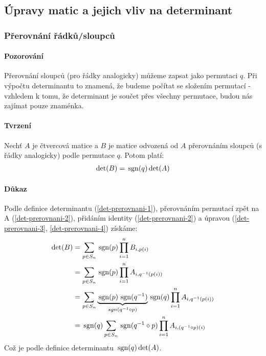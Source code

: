 \documentclass[a4paper,10pt]{article}
\begin{document}
\subsection{Úpravy matic a jejich vliv na determinant}
\setcounter{equation}{0}

\subsubsection{Přerovnání řádků/sloupců}
\setcounter{equation}{0}
\paragraph{Pozorování}
Přerovnání sloupců (pro řádky analogicky) můžeme zapsat jako permutaci $q$. Při
výpočtu determinantu to znamená, že budeme počítat se složením permutací -
vzhledem k tomu, že determinant je součet přes všechny permutace, budou nás
zajímat pouze znaménka.

\paragraph{Tvrzení}
Nechť $A$ je čtvercová matice a $B$ je matice odvozená od $A$ přerovnáním sloupců (s
řádky analogicky) podle permutace $q$. Potom platí:
\begin{align*} 
	\det(B) = \operatorname*{\,sgn} (q) \det (A)
\end{align*}

\paragraph{Důkaz}
Podle definice determinantu (\ref{det-prerovnani-1}), přerovnáním permutací zpět
na A (\ref{det-prerovnani-2}), přidáním identity (\ref{det-prerovnani-2}) a
úpravou (\ref{det-prerovnani-3}, \ref{det-prerovnani-4}) získáme:
\begin{align} 
	\det(B) &= \sum_{p \in S_n} \operatorname*{\,sgn} (p) \prod_{i=1}^n B_{i,p(i)}
							\label{det-prerovnani-1}\\
	&= \sum_{p \in S_n} \operatorname*{\,sgn} (p) \prod_{i=1}^n A_{i,q^{-1}(p(i))}
							\label{det-prerovnani-2} \\
	&= \sum_{p \in S_n} \underbrace{\operatorname*{\,sgn} (p) \operatorname*{\,sgn}(q^{-1})}_{sgn(q^{-1} \circ p)} 
		\operatorname*{\,sgn}(q) \prod_{i=1}^n A_{i,q^{-1}(p(i))}
							\label{det-prerovnani-3} \\
	&= \operatorname*{\,sgn} (q) \sum_{p \in S_n} \operatorname*{\,sgn} (q^{-1} \circ p) \prod_{i=1}^n A_{i,
	(q^{-1} \circ p)(i)} 
							\label{det-prerovnani-4} 
\end{align} 
Což je podle definice determinantu $\operatorname*{\,sgn} (q) \det (A)$.
\end{document}
